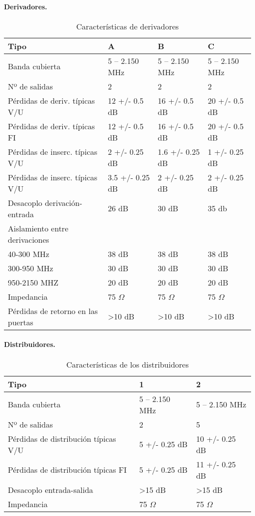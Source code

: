 \paragraph{Derivadores.}

\begin{table}[H]
\caption{Características de derivadores}
\centering
\label{derivadores}
\begin{tabular}{l l l l}
    Tipo & A & B & C\\
\hline
\hline
    Banda cubierta  & 5 – 2.150 MHz & 5 – 2.150 MHz & 5 – 2.150 MHz \\
    Nº de salidas & 2 & 2 & 2\\
    Pérdidas de deriv. típicas V/U & 12 +/- 0.5 dB & 16 +/- 0.5 dB & 20 +/- 0.5 dB\\
    Pérdidas de deriv. típicas FI & 12 +/- 0.5 dB & 16 +/- 0.5 dB & 20 +/- 0.5 dB\\
    Pérdidas de inserc. típicas V/U & 2 +/- 0.25 dB & 1.6 +/- 0.25 dB & 1 +/- 0.25 dB\\
    Pérdidas de inserc. típicas V/U & 3.5 +/- 0.25 dB & 2 +/- 0.25 dB & 2 +/- 0.25 dB\\
    Desacoplo derivación-entrada & 26 dB & 30 dB & 35 db\\
    Aislamiento entre derivaciones & & &\\
    40-300 MHz & 38 dB & 38 dB & 38 dB\\
    300-950 MHz & 30 dB & 30 dB & 30 dB\\
    950-2150 MHZ & 20 dB & 20 dB & 20 dB\\
    Impedancia & 75 $\Omega$ & 75 $\Omega$ & 75 $\Omega$\\
    Pérdidas de retorno en las puertas & >10 dB & >10 dB & >10 dB
\end{tabular}
\end{table}

\paragraph{Distribuidores.}

\begin{table}[H]
\caption{Características de los distribuidores}
\centering
\label{distribuidores}
\begin{tabular}{l l l}
    Tipo & 1 & 2\\
\hline
\hline
    Banda cubierta  & 5 – 2.150 MHz & 5 – 2.150 MHz \\
    Nº de salidas & 2 & 5\\ 
    Pérdidas de distribución típicas V/U & 5 +/- 0.25 dB & 10 +/- 0.25 dB\\
    Pérdidas de distribución típicas FI & 5 +/- 0.25 dB & 11 +/- 0.25 dB\\
    Desacoplo entrada-salida & >15 dB & >15 dB\\
    Impedancia & 75 $\Omega$ & 75 $\Omega$\\
\end{tabular}
\end{table}

